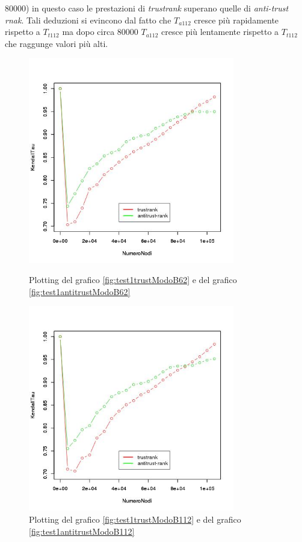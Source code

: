 80000) in questo caso le prestazioni di \textit{trustrank} superano quelle di \textit{anti-trust rnak}. Tali deduzioni si evincono dal fatto che \(T_{a112}\) cresce più rapidamente rispetto a \(T_{t112}\) ma dopo circa 80000 \(T_{a112}\) cresce più lentamente rispetto a \(T_{t112}\) che raggunge valori più alti.

 \begin{figure}
\centering
 \includegraphics[height=9cm]{immagini/test1/coplotTrustAnti_62}
 \caption{Plotting del grafico \ref{fig:test1trustModoB62} e del  grafico \ref{fig:test1antitrustModoB62}}
 \label{fig:test1coplot62}
\centering
 \includegraphics[height=9cm]{immagini/test1/coplotTrustAnti_112}
 \caption{Plotting del grafico \ref{fig:test1trustModoB112} e del  grafico \ref{fig:test1antitrustModoB112}}
 \label{fig:test1coplot112}
\end{figure}

